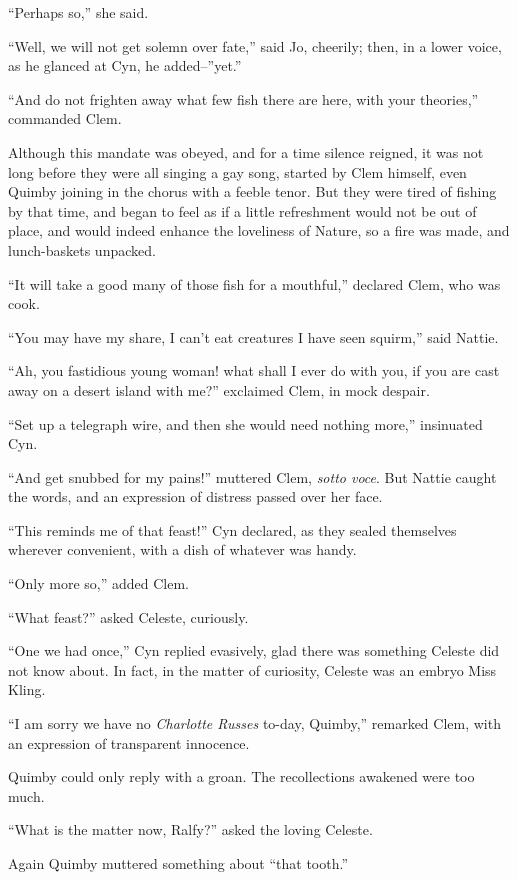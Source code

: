``Perhaps so,'' she said.

``Well, we will not get solemn over fate,'' said Jo, cheerily; then, in a
lower voice, as he glanced at Cyn, he added--''yet.''

``And do not frighten away what few fish there are here, with your
theories,'' commanded Clem.

Although this mandate was obeyed, and for a time silence reigned, it was
not long before they were all singing a gay song, started by Clem
himself, even Quimby joining in the chorus with a feeble tenor. But they
were tired of fishing by that time, and began to feel as if a little
refreshment would not be out of place, and would indeed enhance the
loveliness of Nature, so a fire was made, and lunch-baskets unpacked.

``It will take a good many of those fish for a mouthful,'' declared Clem,
who was cook.

``You may have my share, I can't eat creatures I have seen squirm,'' said
Nattie.

``Ah, you fastidious young woman! what shall I ever do with you, if you
are cast away on a desert island with me?'' exclaimed Clem, in mock
despair.

``Set up a telegraph wire, and then she would need nothing more,''
insinuated Cyn.

``And get snubbed for my pains!'' muttered Clem, \emph{sotto voce}. But Nattie
caught the words, and an expression of distress passed over her face.

``This reminds me of that feast!'' Cyn declared, as they sealed themselves
wherever convenient, with a dish of whatever was handy.

``Only more so,'' added Clem.

``What feast?'' asked Celeste, curiously.

``One we had once,'' Cyn replied evasively, glad there was something
Celeste did not know about. In fact, in the matter of curiosity, Celeste
was an embryo Miss Kling.

``I am sorry we have no \emph{Charlotte Russes} to-day, Quimby,'' remarked Clem,
with an expression of transparent innocence.

Quimby could only reply with a groan. The recollections awakened were
too much.

``What is the matter now, Ralfy?'' asked the loving Celeste.

Again Quimby muttered something about ``that tooth.''

